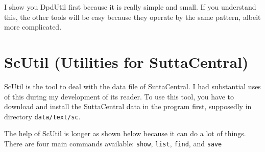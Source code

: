 I show you DpdUtil first because it is really simple and small. If you understand this, the other tools will be easy because they operate by the same pattern, albeit more complicated.

\section{ScUtil (Utilities for SuttaCentral)}

ScUtil is the tool to deal with the data file of SuttaCentral. I had substantial uses of this during my development of its reader. To use this tool, you have to download and install the SuttaCentral data in the program first, supposedly in directory \texttt{data/text/sc}.


The help of ScUtil is longer as shown below because it can do a lot of things. There are four main commands available: \texttt{show}, \texttt{list}, \texttt{find}, and \texttt{save}

